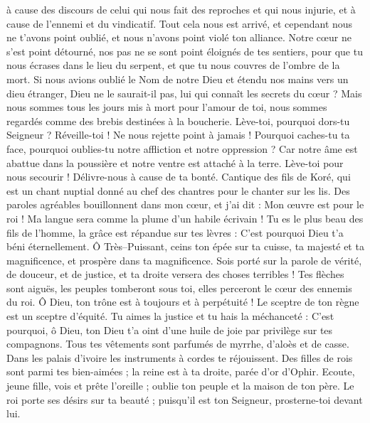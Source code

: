 \begin{multicols}{2}
à cause des discours de celui qui nous fait des reproches et qui nous injurie, et à cause de l'ennemi et du vindicatif.
Tout cela nous est arrivé, et cependant nous ne t'avons point oublié, et nous n'avons point violé ton alliance.
Notre cœur ne s'est point détourné, nos pas ne se sont point éloignés de tes sentiers,
pour que tu nous écrases dans le lieu du serpent, et que tu nous couvres de l'ombre de la mort.
Si nous avions oublié le Nom de notre Dieu et étendu nos mains vers un dieu étranger,
Dieu ne le saurait-il pas, lui qui connaît les secrets du cœur ?
Mais nous sommes tous les jours mis à mort pour l'amour de toi, nous sommes regardés comme des brebis destinées à la boucherie.
Lève-toi, pourquoi dors-tu Seigneur ? Réveille-toi ! Ne nous rejette point à jamais !
Pourquoi caches-tu ta face, pourquoi oublies-tu notre affliction et notre oppression ?
Car notre âme est abattue dans la poussière et notre ventre est attaché à la terre.
Lève-toi pour nous secourir ! Délivre-nous à cause de ta bonté.
\VerseOne{}Cantique des fils de Koré, qui est un chant nuptial donné au chef des chantres pour le chanter sur les lis.
Des paroles agréables bouillonnent dans mon cœur, et j'ai dit : Mon œuvre est pour le roi ! Ma langue sera comme la plume d'un habile écrivain !
Tu es le plus beau des fils de l'homme, la grâce est répandue sur tes lèvres : C'est pourquoi Dieu t'a béni éternellement.
Ô Très–Puissant, ceins ton épée sur ta cuisse, ta majesté et ta magnificence,
et prospère dans ta magnificence. Sois porté sur la parole de vérité, de douceur, et de justice, et ta droite versera des choses terribles !
Tes flèches sont aiguës, les peuples tomberont sous toi, elles perceront le cœur des ennemis du roi.
Ô Dieu, ton trône est à toujours et à perpétuité ! Le sceptre de ton règne est un sceptre d'équité.
Tu aimes la justice et tu hais la méchanceté : C'est pourquoi, ô Dieu, ton Dieu t'a oint d'une huile de joie par privilège sur tes compagnons.
Tous tes vêtements sont parfumés de myrrhe, d'aloès et de casse. Dans les palais d'ivoire les instruments à cordes te réjouissent.
Des filles de rois sont parmi tes bien-aimées ; la reine est à ta droite, parée d'or d'Ophir.
Ecoute, jeune fille, vois et prête l'oreille ; oublie ton peuple et la maison de ton père.
Le roi porte ses désirs sur ta beauté ; puisqu'il est ton Seigneur, prosterne-toi devant lui.

\end{multicols}
